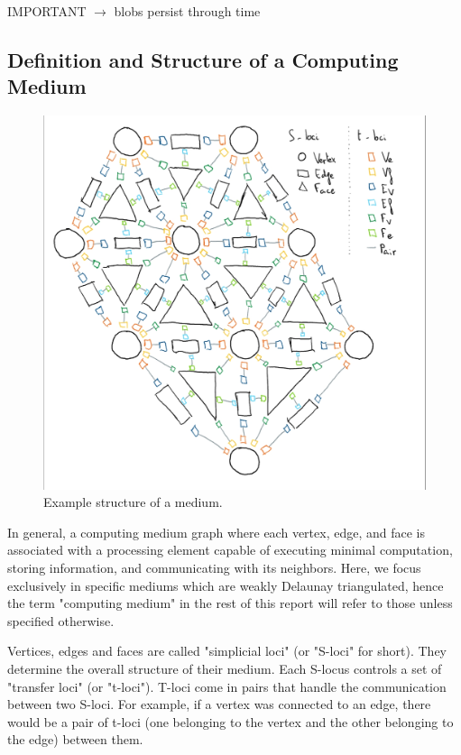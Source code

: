 \documentclass{article}
\begin{document}
IMPORTANT $\longrightarrow$ blobs persist through time

\subsection{Definition and Structure of a Computing Medium}

\begin{figure}[H]
	\centering\includegraphics[width=0.9\linewidth]{assets/handdrawn_medium.png}
	\caption{Example structure of a medium.}
	\label{fig:example_structure}
\end{figure}

In general, a computing medium graph where each vertex, edge, and face is associated with a processing element capable of executing minimal computation, storing information, and communicating with its neighbors. Here, we focus exclusively in specific mediums which are weakly Delaunay triangulated, hence the term "computing medium" in the rest of this report will refer to those unless specified otherwise.

Vertices, edges and faces are called "simplicial loci" (or "S-loci" for short). They determine the overall structure of their medium. Each S-locus controls a set of "transfer loci" (or "t-loci"). T-loci come in pairs that handle the communication between two S-loci. For example, if a vertex was connected to an edge, there would be a pair of t-loci (one belonging to the vertex and the other belonging to the edge) between them.
\end{document}
